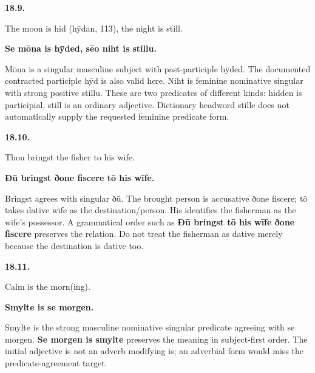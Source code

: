 \par\begin{minipage}{\linewidth}\raggedright
\textbf{18.9.}

The moon is hid (hȳdan, 113), the night is still.

\textbf{Se mōna is hȳded, sēo niht is stillu.}

Mōna is a singular masculine subject with past-participle hȳded. The documented contracted participle hȳd is also valid here. Niht is feminine nominative singular with strong positive stillu. These are two predicates of different kinds: hidden is participial, still is an ordinary adjective. Dictionary headword stille does not automatically supply the requested feminine predicate form.

\end{minipage}\par\addvspace{4pt}

\par\begin{minipage}{\linewidth}\raggedright
\textbf{18.10.}

Thou bringst the fisher to his wife.

\textbf{Ðū bringst ðone fiscere tō his wīfe.}

Bringst agrees with singular ðū. The brought person is accusative ðone fiscere; tō takes dative wīfe as the destination/\allowbreak{}person. His identifies the fisherman as the wife's possessor. A grammatical order such as \textbf{Ðū bringst tō his wīfe ðone fiscere} preserves the relation. Do not treat the fisherman as dative merely because the destination is dative too.

\end{minipage}\par\addvspace{4pt}

\par\begin{minipage}{\linewidth}\raggedright
\textbf{18.11.}

Calm is the morn(ing).

\textbf{Smylte is se morgen.}

Smylte is the strong masculine nominative singular predicate agreeing with se morgen. \textbf{Se morgen is smylte} preserves the meaning in subject-first order. The initial adjective is not an adverb modifying is; an adverbial form would miss the predicate-agreement target.

\end{minipage}\par\addvspace{4pt}

